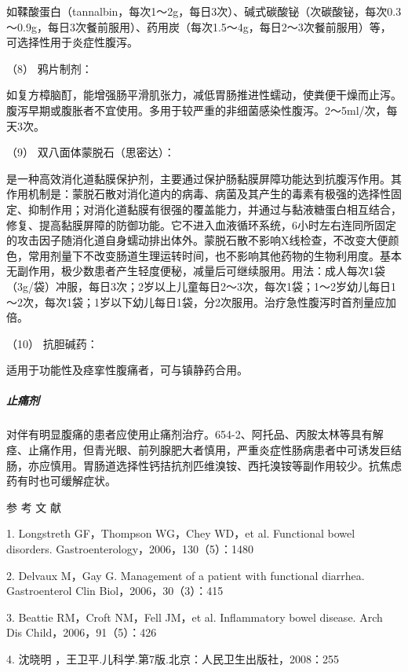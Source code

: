 如鞣酸蛋白（tannalbin，每次1～2g，每日3次）、碱式碳酸铋（次碳酸铋，每次0.3～0.9g，每日3次餐前服用）、药用炭（每次1.5～4g，每日2～3次餐前服用）等，可选择性用于炎症性腹泻。

\hypertarget{text00030.htmlux5cux23CHP1-12-3-2-6-8}{}
（8） 鸦片制剂：

如复方樟脑酊，能增强肠平滑肌张力，减低胃肠推进性蠕动，使粪便干燥而止泻。腹泻早期或腹胀者不宜使用。多用于较严重的非细菌感染性腹泻。2～5ml/次，每天3次。

\hypertarget{text00030.htmlux5cux23CHP1-12-3-2-6-9}{}
（9） 双八面体蒙脱石（思密达）：

是一种高效消化道黏膜保护剂，主要通过保护肠黏膜屏障功能达到抗腹泻作用。其作用机制是：蒙脱石散对消化道内的病毒、病菌及其产生的毒素有极强的选择性固定、抑制作用；对消化道黏膜有很强的覆盖能力，并通过与黏液糖蛋白相互结合，修复、提高黏膜屏障的防御功能。它不进入血液循环系统，6小时左右连同所固定的攻击因子随消化道自身蠕动排出体外。蒙脱石散不影响X线检查，不改变大便颜色，常用剂量下不改变肠道生理运转时间，也不影响其他药物的生物利用度。基本无副作用，极少数患者产生轻度便秘，减量后可继续服用。用法：成人每次1袋（3g/袋）冲服，每日3次；2岁以上儿童每日2～3次，每次1袋；1～2岁幼儿每日1～2次，每次1袋；1岁以下幼儿每日1袋，分2次服用。治疗急性腹泻时首剂量应加倍。

\hypertarget{text00030.htmlux5cux23CHP1-12-3-2-6-10}{}
（10） 抗胆碱药：

适用于功能性及痉挛性腹痛者，可与镇静药合用。

\subparagraph{止痛剂}

对伴有明显腹痛的患者应使用止痛剂治疗。654-2、阿托品、丙胺太林等具有解痉、止痛作用，但青光眼、前列腺肥大者慎用，严重炎症性肠病患者中可诱发巨结肠，亦应慎用。胃肠道选择性钙拮抗剂匹维溴铵、西托溴铵等副作用较少。抗焦虑药有时也可缓解症状。

\protect\hypertarget{text00031.html}{}{}

\hypertarget{text00031.htmlux5cux23CHP1-12-4}{}
参 考 文 献

1. Longstreth GF，Thompson WG，Chey WD，et al. Functional bowel
disorders. Gastroenterology，2006，130（5）：1480

2. Delvaux M，Gay G. Management of a patient with functional diarrhea.
Gastroenterol Clin Biol，2006，30（3）：415

3. Beattie RM，Croft NM，Fell JM，et al. Inflammatory bowel disease.
Arch Dis Child，2006，91（5）：426

4. 沈晓明 ，王卫平.儿科学.第7版.北京：人民卫生出版社，2008：255

